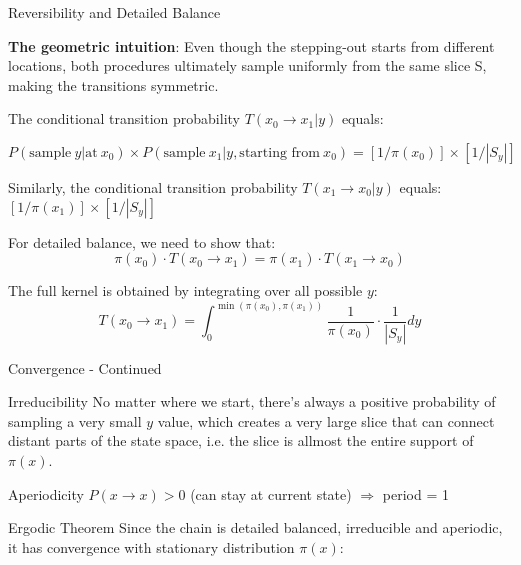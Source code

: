 \begin{frame}{Reversibility and Detailed Balance}

	\textbf{The geometric intuition}: Even though the stepping-out starts from different locations,
	both procedures ultimately sample uniformly from the same slice S, making the transitions symmetric.

	\vspace{0.3cm}
	The conditional transition probability $T(x_0 \rightarrow x_1 | y)$ equals:

	$P(\text{sample}\: y \vert \text{at}\: x_0) \times P(\text{sample}\: x_1 | y, \text{starting from}\: x_0)=  [1/\pi(x_0)] \times [1/|S_y|]$

	Similarly, the conditional transition probability $T(x_1 \rightarrow x_0 | y)$ equals: $[1/\pi(x_1)] \times [1/|S_y|]$

	For detailed balance, we need to show that:
	$$\pi(x_0) \cdot T(x_0 \rightarrow x_1) = \pi(x_1) \cdot T(x_1 \rightarrow x_0)$$


	The full kernel is obtained by integrating over all possible $y$:
	$$T(x_0 \rightarrow x_1) = \int_0^{\min(\pi(x_0),\pi(x_1))} \frac{1}{\pi(x_0)} \cdot \frac{1}{|S_y|} dy$$

\end{frame}

\begin{frame}{Convergence - Continued}
	\begin{block}{Irreducibility}
		No matter where we start, there's always a positive probability of sampling a
		very small $y$ value, which creates a very large slice that can connect distant
		parts of the state space, i.e. the slice is allmost the entire support of $\pi(x)$.
	\end{block}

	\begin{block}{Aperiodicity}
		$P(x \to x) > 0$ (can stay at current state) $\Rightarrow$ period = 1
	\end{block}

	\begin{block}{Ergodic Theorem}
		Since the chain is detailed balanced, irreducible and aperiodic,
		it has convergence with stationary distribution $\pi(x)$:
	\end{block}
\end{frame}

